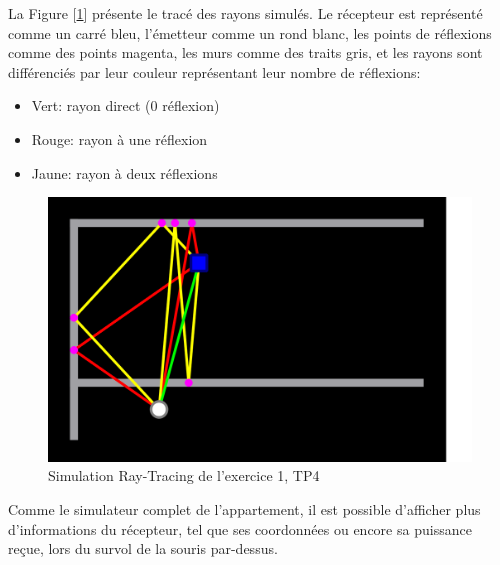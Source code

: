 La Figure [\ref{fig:simu-tp4}] présente le tracé des rayons simulés. Le récepteur est représenté comme un carré bleu, l'émetteur comme un rond blanc, les points de réflexions comme des points magenta, les murs comme des traits gris, et les rayons sont différenciés par leur couleur représentant leur nombre de réflexions:
\begin{itemize}
    \item Vert: rayon direct (0 réflexion)
    \item Rouge: rayon à une réflexion
    \item Jaune: rayon à deux réflexions
\end{itemize}

\begin{figure}[H]
    \centering    \includegraphics[width=\textwidth]{latex/images/tp4.png}
    \caption{Simulation Ray-Tracing de l'exercice 1, TP4}
    \label{fig:simu-tp4}
\end{figure}

Comme le simulateur complet de l'appartement, il est possible d'afficher plus d'informations du récepteur, tel que ses coordonnées ou encore sa puissance reçue, lors du survol de la souris par-dessus.
